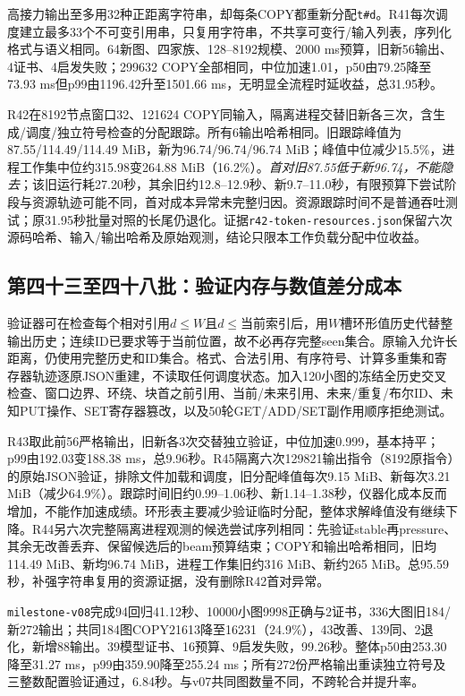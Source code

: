 \documentclass[UTF8,11pt,fontset=fandol]{ctexart}
\begin{document}
高接力输出至多用32种正距离字符串，却每条COPY都重新分配\texttt{t\#d}。R41每次调度建立最多33个不可变引用串，只复用字符串，不共享可变行/输入列表，序列化格式与语义相同。64新图、四家族、128--8192规模、2000 ms预算，旧新56输出、4证书、4启发失败；299632 COPY全部相同，中位加速1.01，p50由79.25降至73.93 ms但p99由1196.42升至1501.66 ms，无明显全流程时延收益，总31.95秒。

R42在8192节点窗口32、121624 COPY同输入，隔离进程交替旧新各三次，含生成/调度/独立符号检查的分配跟踪。所有6输出哈希相同。旧跟踪峰值为87.55/114.49/114.49 MiB，新为96.74/96.74/96.74 MiB；峰值中位减少15.5\%，进程工作集中位约315.98变264.88 MiB（16.2\%）。\emph{首对旧87.55低于新96.74，不能隐去}；该旧运行耗27.20秒，其余旧约12.8--12.9秒、新9.7--11.0秒，有限预算下尝试阶段与资源轨迹可能不同，首对成本异常未完整归因。资源跟踪时间不是普通吞吐测试；原31.95秒批量对照的长尾仍退化。证据\texttt{r42-token-resources.json}保留六次源码哈希、输入/输出哈希及原始观测，结论只限本工作负载分配中位收益。

\subsection{第四十三至四十八批：验证内存与数值差分成本}
验证器可在检查每个相对引用$d\leq W$且$d\leq$当前索引后，用$W$槽环形值历史代替整输出历史；连续ID已要求等于当前位置，故不必再存完整seen集合。原输入允许长距离，仍使用完整历史和ID集合。格式、合法引用、有序符号、计算多重集和寄存器轨迹逐原JSON重建，不读取任何调度状态。加入120小图的冻结全历史交叉检查、窗口边界、环绕、块首之前引用、当前/未来引用、未来/重复/布尔ID、未知PUT操作、SET寄存器篡改，以及50轮GET/ADD/SET副作用顺序拒绝测试。

R43取此前56严格输出，旧新各3次交替独立验证，中位加速0.999，基本持平；p99由192.03变188.38 ms，总9.96秒。R45隔离六次129821输出指令（8192原指令）的原始JSON验证，排除文件加载和调度，旧分配峰值每次9.15 MiB、新每次3.21 MiB（减少64.9\%）。跟踪时间旧约0.99--1.06秒、新1.14--1.38秒，仪器化成本反而增加，不能作加速成绩。环形表主要减少验证临时分配，整体求解峰值没有继续下降。R44另六次完整隔离进程观测的候选尝试序列相同：先验证stable再pressure、其余无改善丢弃、保留候选后的beam预算结束；COPY和输出哈希相同，旧均114.49 MiB、新均96.74 MiB，进程工作集旧约316 MiB、新约265 MiB。总95.59秒，补强字符串复用的资源证据，没有删除R42首对异常。

\texttt{milestone-v08}完成94回归41.12秒、10000小图9998正确与2证书，336大图旧184/新272输出；共同184图COPY21613降至16231（24.9\%），43改善、139同、2退化，新增88输出。39模型证书、16预算、9启发失败，99.26秒。整体p50由253.30降至31.27 ms，p99由359.90降至255.24 ms；所有272份严格输出重读独立符号及三整数配置验证通过，6.84秒。与v07共同图数量不同，不跨轮合并提升率。
\end{document}

